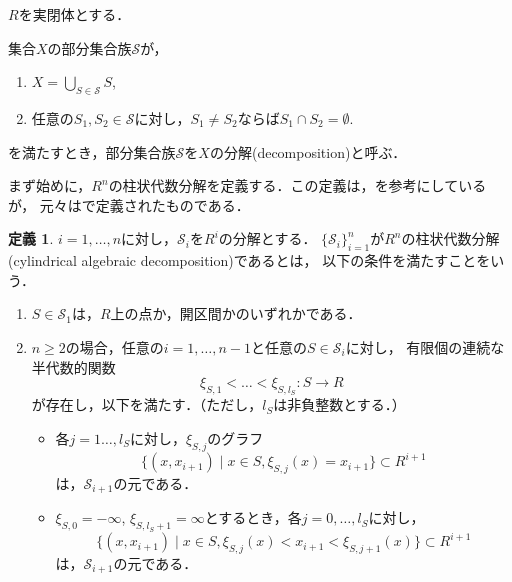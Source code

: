 \documentclass[uplatex, dvipdfmx]{jsarticle}
\numberwithin{equation}{section}
\newcommand{\map}[3]{{#1}\colon{#2}\rightarrow{#3}}
\theoremstyle{definition}
\newtheorem{definition}{定義}[section]
\begin{document}
$R$を実閉体とする．

集合$X$の部分集合族$\mathcal{S}$が，
\begin{enumerate}
     \item $X = \bigcup_{S \in \mathcal{S}} S$,
     \item 任意の$S_1, S_2 \in \mathcal{S}$に対し，$S_1 \neq S_2$ならば$S_1 \cap S_2 = \emptyset$.
\end{enumerate}
を満たすとき，部分集合族$\mathcal{S}$を$X$の分解(decomposition)と呼ぶ．

まず始めに，$R^n$の柱状代数分解を定義する．この定義は，\cite[Definition 5.1]{MR2248869}を参考にしているが，
元々は\cite[section 3]{MR0403962}で定義されたものである．

\begin{definition} \label{definition:cad}
     $i=1, \dots, n$に対し，$\mathcal{S}_i$を$R^i$の分解とする．
     $\{\mathcal{S}_i\}_{i=1}^n$が$R^n$の柱状代数分解(cylindrical algebraic decomposition)であるとは，
     以下の条件を満たすことをいう．
     \begin{enumerate}
          \item $S \in \mathcal{S}_1$は，$R$上の点か，開区間かのいずれかである．
          \item $n\geq 2$の場合，任意の$i=1, \dots, n-1$と任意の$S \in \mathcal{S}_i$に対し，
          有限個の連続な半代数的関数
          \begin{equation}
               \map{\xi_{S,1}< \dots <\xi_{S,l_S}}{S}{R}
          \end{equation}
          が存在し，以下を満たす．（ただし，$l_S$は非負整数とする．）
          \begin{itemize}
               \item 各$j=1 \dots, l_S$に対し，$\xi_{S,j}$のグラフ
               \begin{equation}
                    \{(x,x_{i+1}) \mid x \in S, \xi_{S,j}(x)=x_{i+1} \} \subset R^{i+1}
               \end{equation}
               は，$\mathcal{S}_{i+1}$の元である．
               \item $\xi_{S,0}=-\infty$, $\xi_{S,l_S+1}=\infty$とするとき，各$j=0, \dots, l_S$に対し，\label{cad_condition1}
               \begin{equation}
                    \{(x,x_{i+1}) \mid x \in S, \xi_{S,j}(x)<x_{i+1}<\xi_{S,j+1}(x) \} \subset R^{i+1}
               \end{equation}
               は，$\mathcal{S}_{i+1}$の元である．
          \end{itemize}
     \end{enumerate}
\end{definition}
\end{document}

